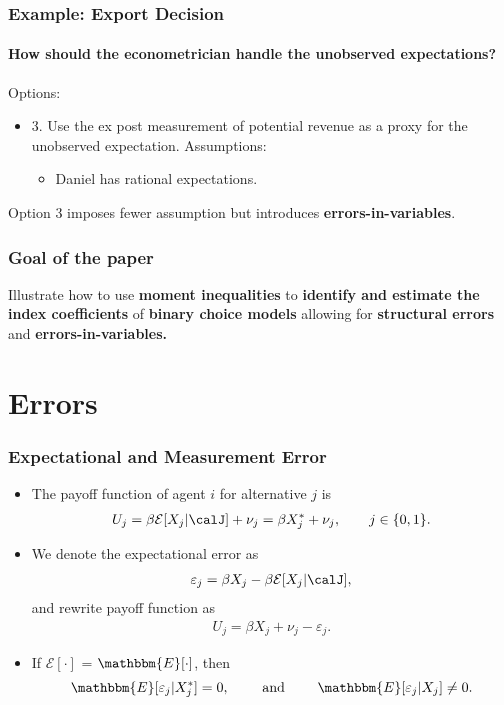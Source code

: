\begin{frame}
\frametitle{Example: Export Decision}
\framesubtitle{How should the econometrician handle the unobserved expectations?}

Options:
\begin{itemize}
	\item 3. Use the ex post measurement of potential revenue as a proxy for the unobserved expectation. Assumptions:
	\begin{itemize}
		\item Daniel has rational expectations.
	\end{itemize}
\end{itemize}
Option 3 imposes fewer assumption but introduces \textbf{errors-in-variables}.
\end{frame}
\begin{frame}
\frametitle{Goal of the paper}

Illustrate how to use \textbf{moment inequalities} to \textbf{identify and estimate the index coefficients}
of \textbf{binary choice models} allowing for \textbf{structural errors}
and \textbf{errors-in-variables.}

\end{frame}
\section{Errors}
\begin{frame}
\frametitle{Expectational and Measurement Error}

\begin{itemize}
	\item The payoff function of agent $i$ for alternative $j$ is
	\begin{align*}
	U_{j} = \beta\mathcal{E}[X_{j}|\calJ]+\nu_{j}= \beta X^{*}_{j}+\nu_{j},\qquad j \in \{0,1\}.
	\end{align*}
	\item We denote the expectational error as
	\begin{align*}
	\varepsilon_{j} = \beta X_{j}-\beta \mathcal{E}[X_{j}|\calJ],
	\end{align*}
	and rewrite payoff function as
	\begin{align*}
	U_{j} = \beta X_{j}+\nu_{j}-\varepsilon_{j}.
	\end{align*}
	\item If $\mathcal{E}[\cdot]$ = $\mathbbm{E}[\cdot]$, then
	\begin{equation*}
	\mathbbm{E}[\varepsilon_{j}|X^{*}_{j}]=0,\qquad\text{ and }\qquad\mathbbm{E}[\varepsilon_{j}|X_{j}]\neq0.
	\end{equation*}
\end{itemize}
\end{frame}

